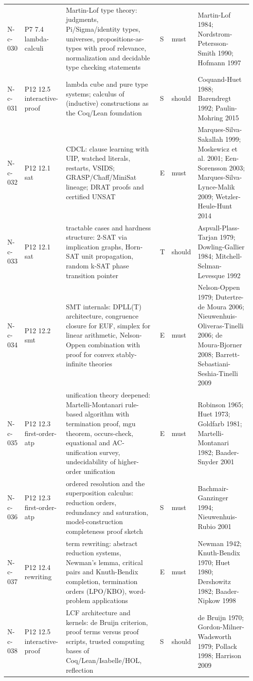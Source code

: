 \begin{longtable}{@{}p{0.52in}p{0.85in}p{2.5in}p{0.22in}p{0.42in}p{1.95in}@{}}
N-c-030 & P7 7.4 lambda-calculi & Martin-Lof type theory: judgments, Pi/Sigma/identity types, universes, propositions-as-types with proof relevance, normalization and decidable type checking statements & S & must & Martin-Lof 1984; Nordstrom-Petersson-Smith 1990; Hofmann 1997 \\
N-c-031 & P12 12.5 interactive-proof & lambda cube and pure type systems; calculus of (inductive) constructions as the Coq/Lean foundation & S & should & Coquand-Huet 1988; Barendregt 1992; Paulin-Mohring 2015 \\
N-c-032 & P12 12.1 sat & CDCL: clause learning with UIP, watched literals, restarts, VSIDS; GRASP/Chaff/MiniSat lineage; DRAT proofs and certified UNSAT & E & must & Marques-Silva-Sakallah 1999; Moskewicz et al. 2001; Een-Sorensson 2003; Marques-Silva-Lynce-Malik 2009; Wetzler-Heule-Hunt 2014 \\
N-c-033 & P12 12.1 sat & tractable cases and hardness structure: 2-SAT via implication graphs, Horn-SAT unit propagation, random k-SAT phase transition pointer & T & should & Aspvall-Plass-Tarjan 1979; Dowling-Gallier 1984; Mitchell-Selman-Levesque 1992 \\
N-c-034 & P12 12.2 smt & SMT internals: DPLL(T) architecture, congruence closure for EUF, simplex for linear arithmetic, Nelson-Oppen combination with proof for convex stably-infinite theories & E & must & Nelson-Oppen 1979; Dutertre-de Moura 2006; Nieuwenhuis-Oliveras-Tinelli 2006; de Moura-Bjorner 2008; Barrett-Sebastiani-Seshia-Tinelli 2009 \\
N-c-035 & P12 12.3 first-order-atp & unification theory deepened: Martelli-Montanari rule-based algorithm with termination proof, mgu theorem, occurs-check, equational and AC-unification survey, undecidability of higher-order unification & E & must & Robinson 1965; Huet 1973; Goldfarb 1981; Martelli-Montanari 1982; Baader-Snyder 2001 \\
N-c-036 & P12 12.3 first-order-atp & ordered resolution and the superposition calculus: reduction orders, redundancy and saturation, model-construction completeness proof sketch & S & must & Bachmair-Ganzinger 1994; Nieuwenhuis-Rubio 2001 \\
N-c-037 & P12 12.4 rewriting & term rewriting: abstract reduction systems, Newman's lemma, critical pairs and Knuth-Bendix completion, termination orders (LPO/KBO), word-problem applications & E & must & Newman 1942; Knuth-Bendix 1970; Huet 1980; Dershowitz 1982; Baader-Nipkow 1998 \\
N-c-038 & P12 12.5 interactive-proof & LCF architecture and kernels: de Bruijn criterion, proof terms versus proof scripts, trusted computing bases of Coq/Lean/Isabelle/HOL, reflection & S & should & de Bruijn 1970; Gordon-Milner-Wadsworth 1979; Pollack 1998; Harrison 2009 \\

\end{longtable}
